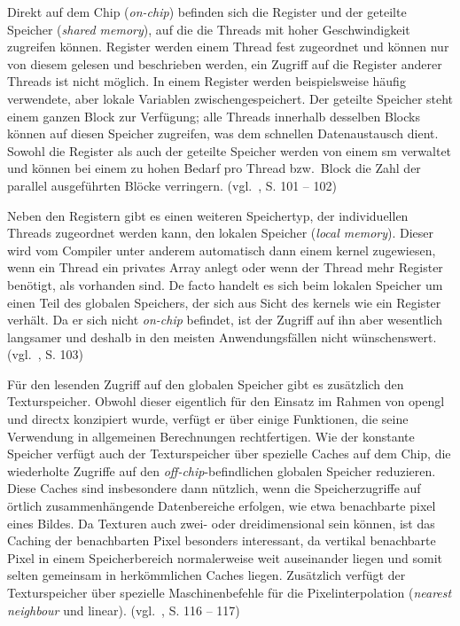 Direkt auf dem Chip (\textit{on-chip}) befinden sich die Register und der geteilte Speicher (\textit{shared memory}),
auf die die Threads mit hoher Geschwindigkeit zugreifen können. Register werden einem Thread fest zugeordnet und können
nur von diesem gelesen und beschrieben werden, ein Zugriff auf die Register anderer Threads ist nicht möglich. In einem
Register werden beispielsweise häufig verwendete, aber lokale Variablen zwischengespeichert. Der geteilte Speicher steht
einem ganzen Block zur Verfügung; alle Threads innerhalb desselben Blocks können auf diesen Speicher zugreifen, was dem
schnellen Datenaustausch dient. Sowohl die Register als auch der geteilte Speicher werden von einem \gls{sm} verwaltet
und können bei einem zu hohen Bedarf pro Thread bzw.\ Block die Zahl der parallel ausgeführten Blöcke verringern.
(vgl.~\cite{kirkhwu}, S. 101 -- 102)

Neben den Registern gibt es einen weiteren Speichertyp, der individuellen Threads zugeordnet werden kann, den lokalen
Speicher (\textit{local memory}). Dieser wird vom Compiler unter anderem automatisch dann einem \gls{kernel} zugewiesen,
wenn ein Thread ein privates Array anlegt oder wenn der Thread mehr Register benötigt, als vorhanden sind. De facto
handelt es sich beim lokalen Speicher um einen Teil des globalen Speichers, der sich aus Sicht des \gls{kernel}s wie ein
Register verhält. Da er sich nicht \textit{on-chip} befindet, ist der Zugriff auf ihn aber wesentlich langsamer und
deshalb in den meisten Anwendungsfällen nicht wünschenswert. (vgl.~\cite{kirkhwu}, S. 103)

Für den lesenden Zugriff auf den globalen Speicher gibt es zusätzlich den Texturspeicher. Obwohl dieser eigentlich für
den Einsatz im Rahmen von \gls{opengl} und \gls{directx} konzipiert wurde, verfügt er über einige Funktionen, die seine
Verwendung in allgemeinen Berechnungen rechtfertigen. Wie der konstante Speicher verfügt auch der Texturspeicher über
spezielle Caches auf dem Chip, die wiederholte Zugriffe auf den \textit{off-chip}-befindlichen globalen Speicher
reduzieren. Diese Caches sind insbesondere dann nützlich, wenn die Speicherzugriffe auf örtlich zusammenhängende
Datenbereiche erfolgen, wie etwa benachbarte \gls{pixel} eines Bildes. Da Texturen auch zwei- oder dreidimensional
sein können, ist das Caching der benachbarten Pixel besonders interessant, da vertikal benachbarte Pixel in einem
Speicherbereich normalerweise weit auseinander liegen und somit selten gemeinsam in herkömmlichen Caches liegen.
Zusätzlich verfügt der Texturspeicher über spezielle Maschinenbefehle für die Pixelinterpolation (\textit{nearest
neighbour} und linear). (vgl.~\cite{sandkand}, S. 116 -- 117)


